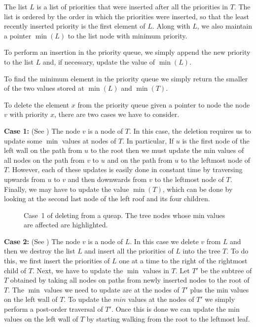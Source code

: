 {The list $L$ is a list of priorities that were inserted after all the
priorities in $T$.  The list is ordered by the order in which the
priorities were inserted, so that the least recently inserted priority
is the first element of $L$.  Along with $L$, we also maintain a
pointer $\min(L)$ to the list node with minimum priority.

To perform an insertion in the priority queue, we simply append the
new priority to the list $L$ and, if necessary, update the value of
$\min(L)$.

To find the minimum element in the priority queue we simply return the
smaller of the two values stored at $\min(L)$ and $\min(T)$.

To delete the element $x$ from the priority queue given a pointer to
node the node $v$ with priority $x$, there are two cases we have to
consider.  

\noindent\textbf{Case 1:} (See ) 
The node $v$ is a node of $T$.  In this case, the deletion requires us
to update some $\min$ values at nodes of $T$.  In particular, If $u$
is the first node of the left wall on the path from $u$ to the root
then we must update the min values of all nodes on the path from $v$
to $u$ and on the path from $u$ to the leftmost node of $T$.  However,
each of these updates is easily done in constant time by traversing
upwards from $u$ to $v$ and then downwards from $v$ to the leftmost
node of $T$.  Finally, we may have to update the value $\min(T)$,
which can be done by looking at the second last node of the left roof
and its four children.

\begin{figure}
\caption{Case~1 of deleting from a queap.  The tree nodes whose min values
 are affected are highlighted.}
\end{figure}

\noindent\textbf{Case 2:} (See ) 
The node $v$ is a node of $L$.  In this case we
delete $v$ from $L$ and then we destroy the list $L$ and insert all
the priorities of $L$ into the tree $T$.  To do this, we first insert
the priorities of $L$ one at a time to the right of the rightmost
child of $T$.  Next, we have to update the $\min$ values in $T$.  Let
$T'$ be the subtree of $T$ obtained by taking all nodes on paths from
newly inserted nodes to the root of $T$.  The $\min$ values we need to
update are at the nodes of $T'$ plus the min values on the left wall
of $T$.  To update the $min$ values at the nodes of $T'$ we simply
perform a post-order traversal of $T'$.  Once this is done we can
update the min values on the left wall of $T$ by starting walking from
the root to the leftmost leaf.

}
